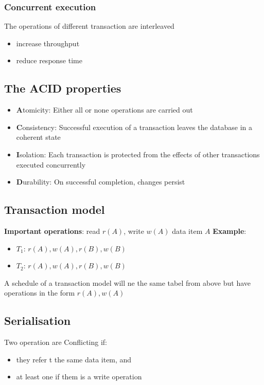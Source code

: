 \documentclass{article}
\begin{document}
\subsubsection*{Concurrent execution}
The operations of different transaction are interleaved
\begin{itemize}
  \item increase throughput
  \item reduce response time
\end{itemize}

\subsection{The ACID properties}
\begin{itemize}
  \item \textbf{A}tomicity: Either all or none operations are carried out
  \item \textbf{C}onsistency: Successful execution of a transaction leaves the database in a coherent state
  \item \textbf{I}solation: Each transaction is protected from the effects of other transactions executed concurrently
  \item \textbf{D}urability: On successful completion, changes persist
\end{itemize}

\subsection{Transaction model}
\textbf{Important operations}: read $r(A)$, write $w(A)$ data item $A$
\textbf{Example}:
\begin{itemize}
  \item $T_1$: $r(A),w(A),r(B),w(B)$
  \item $T_2$: $r(A),w(A),r(B),w(B)$
\end{itemize}
A schedule of a transaction model will ne the same tabel from above but have operations in the form $r(A),w(A)$

\subsection{Serialisation}
Two operation are Conflicting if:
\begin{itemize}
  \item they refer t the same data item, and
  \item at least one if them is a write operation
\end{itemize}
\end{document}
